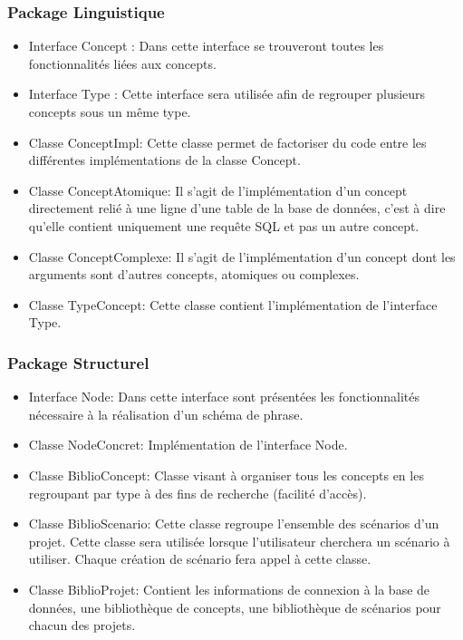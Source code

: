\documentclass[12pt]{report}
\begin{document}
\subsubsection*{Package Linguistique}
\begin{itemize}
\item Interface Concept : Dans cette interface se trouveront toutes les fonctionnalités liées aux concepts.

\item Interface Type : Cette interface sera utilisée afin de regrouper plusieurs concepts sous un même type. 

\item Classe ConceptImpl: Cette classe permet de factoriser du code entre les différentes implémentations de la classe Concept.

\item Classe ConceptAtomique: Il s'agit de l'implémentation d'un concept directement relié à une ligne d'une table de la base de données, c'est à dire qu'elle contient uniquement une requête SQL et pas un autre concept.

\item Classe ConceptComplexe: Il s'agit de l'implémentation d'un concept dont les arguments sont d'autres concepts, atomiques ou complexes.

\item Classe TypeConcept: Cette classe contient l'implémentation de l'interface Type.
\end{itemize}

\subsubsection*{Package Structurel}
\begin{itemize}
\item Interface Node: Dans cette interface sont présentées les fonctionnalités nécessaire à la réalisation d'un schéma de phrase.

\item Classe NodeConcret: Implémentation de l'interface Node.

\item Classe BiblioConcept: Classe visant à organiser tous les concepts en les regroupant par type à des fins de recherche (facilité d'accès).

\item Classe BiblioScenario: Cette classe regroupe l'ensemble des scénarios d'un projet. Cette classe sera utilisée lorsque l'utilisateur cherchera un scénario à utiliser. Chaque création de scénario fera appel à cette classe.

\item Classe BiblioProjet: Contient les informations de connexion à la base de données, une bibliothèque de concepts, une bibliothèque de scénarios pour chacun des projets.
\end{itemize}
\end{document}

